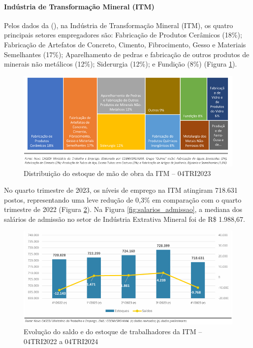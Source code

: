 \paragraph{Indústria de Transformação Mineral (ITM)}

Pelos dados da \citeauthor{anm2023informe4} (\citeyear{anm2023informe4}), na Indústria de Transformação Mineral (ITM), os quatro principais setores empregadores são: Fabricação de Produtos Cerâmicos (18\%); Fabricação de Artefatos de Concreto, Cimento, Fibrocimento, Gesso e Materiais Semelhantes (17\%); Aparelhamento de pedras e fabricação de outros produtos de minerais não metálicos (12\%); Siderurgia (12\%); e Fundição (8\%) (Figura \ref{fig:distribuicao_itm}).

\begin{figure}[!htb]
    \centering
    \includegraphics[width=\textwidth]{figures/image9_distribuicao_itm.png}
    \caption{Distribuição do estoque de mão de obra da ITM -- 04TRI2023}
    \label{fig:distribuicao_itm}
\end{figure}

No quarto trimestre de 2023, os níveis de emprego na ITM atingiram 718.631 postos, representando uma leve redução de 0,3\% em comparação com o quarto trimestre de 2022 (Figura \ref{fig:evolucao_saldo_itm}). Na Figura \ref{fig:salarios_admissao}, a mediana dos salários de admissão no setor de Indústria Extrativa Mineral foi de R\$ 1.988,67.

\begin{figure}[!htb]
    \centering
    \includegraphics[width=\textwidth]{figures/image10_evolucao_saldo_itm.png}
    \caption{Evolução do saldo e do estoque de trabalhadores da ITM -- 04TRI2022 a 04TRI2024}
    \label{fig:evolucao_saldo_itm}
\end{figure}

